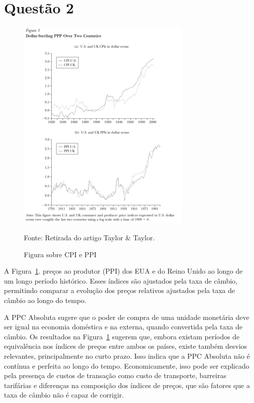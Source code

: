 \documentclass[a4paper,12pt]{article}[abntex2]
\begin{document}
\section{\textbf{Questão 2}}
\begin{figure}[H]
    \centering
    \caption{Figura sobre CPI e PPI} 
    \includegraphics[width=0.75\textwidth]{Macroeconomia Internacional/APS 3 Macro Int/CPI & PPI.png}
    \label{fig:cpippi}
    
    \footnotesize{Fonte: Retirada do artigo Taylor & Taylor.}
    \end{figure}
    
A Figura~\ref{fig:cpippi}. preços ao produtor (PPI) dos EUA e do Reino Unido ao longo de um longo período histórico. Esses índices são ajustados pela taxa de câmbio, permitindo comparar a evolução dos preços relativos ajustados pela taxa de câmbio ao longo do tempo.

A PPC Absoluta sugere que o poder de compra de uma unidade monetária deve ser igual na economia doméstica e na externa, quando convertida pela taxa de câmbio. Os resultados na Figura~\ref{fig:cpippi} sugerem que, embora existam períodos de equivalência nos índices de preços entre ambos os países, existe também desvios relevantes, principalmente no curto prazo. Isso indica que a PPC Absoluta não é contínua e perfeita ao longo do tempo. Economicamente, isso pode ser explicado pela presença de custos de transação como custo de transporte, barreiras tarifárias e diferenças na composição dos índices de preços, que são fatores que a taxa de câmbio não é capaz de corrigir.
\end{document}
